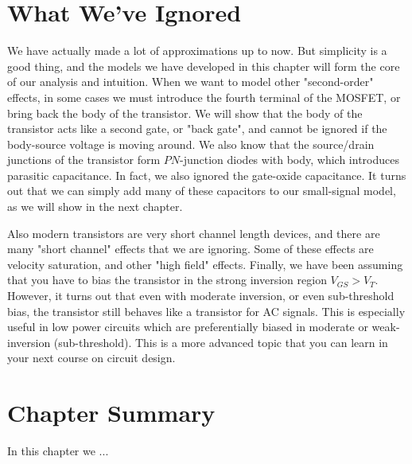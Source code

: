 \section{What We've Ignored}
We have actually made a lot of approximations up to now.  But simplicity is a good thing, and the models we have developed in this chapter will form the core of our analysis and intuition.  When we want to model other "second-order" effects, in some cases we must introduce the fourth terminal of the MOSFET, or bring back the body of the transistor.  We will show that the body of the transistor acts like a second gate, or "back gate", and cannot be ignored if the body-source voltage is moving around.  We also know that the source/drain junctions of the transistor form $PN$-junction diodes with body, which  introduces parasitic capacitance.  In fact, we also ignored the gate-oxide capacitance. It turns out that we can simply add many of these capacitors to our small-signal model, as we will show in the next chapter.

Also modern transistors are very short channel length devices, and there are many "short channel" effects that we are ignoring.  Some of these effects are velocity saturation, and other "high field" effects.  Finally, we have been assuming that you have to bias the transistor in the strong inversion region $V_{GS} > V_T$.  However, it turns out that even with moderate inversion, or even sub-threshold bias, the transistor still behaves like a transistor for AC signals.  This is especially useful in low power circuits which are preferentially biased in moderate or weak-inversion (sub-threshold).  This is a more advanced topic that you can learn in your next course on circuit design.
\newpage
\section{Chapter Summary}
In this chapter we ...
